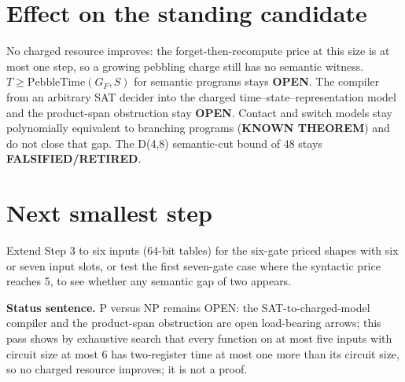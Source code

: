 \documentclass[11pt]{article}
\begin{document}
\section*{Effect on the standing candidate}
No charged resource improves: the forget-then-recompute price at this size is at most one step, so a growing pebbling charge still has no semantic witness. $T\ge\mathrm{PebbleTime}(G_F,S)$ for semantic programs stays \textbf{OPEN}. The compiler from an arbitrary SAT decider into the charged time--state--representation model and the product-span obstruction stay \textbf{OPEN}. Contact and switch models stay polynomially equivalent to branching programs (\textbf{KNOWN THEOREM}) and do not close that gap. The D(4,8) semantic-cut bound of 48 stays \textbf{FALSIFIED/RETIRED}.

\section*{Next smallest step}
Extend Step 3 to six inputs ($64$-bit tables) for the six-gate priced shapes with six or seven input slots, or test the first seven-gate case where the syntactic price reaches 5, to see whether any semantic gap of two appears.

\bigskip
\noindent\textbf{Status sentence.} P versus NP remains OPEN: the SAT-to-charged-model compiler and the product-span obstruction are open load-bearing arrows; this pass shows by exhaustive search that every function on at most five inputs with circuit size at most 6 has two-register time at most one more than its circuit size, so no charged resource improves; it is not a proof.
\end{document}
